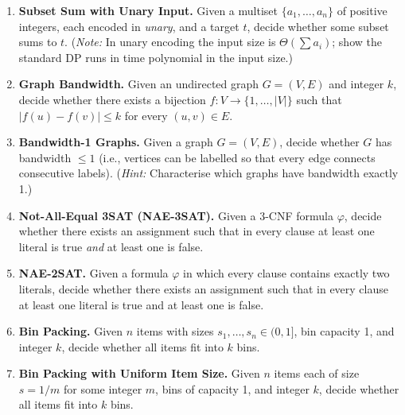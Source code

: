 \documentclass[9pt]{book}
\begin{document}
\begin{enumerate}[label=\arabic*.]
\bigskip

\item \textbf{Subset Sum with Unary Input.}
Given a multiset $\{a_1,\ldots,a_n\}$ of positive integers, each encoded in \emph{unary}, and a target $t$, decide whether some subset sums to $t$.
(\textit{Note:} In unary encoding the input size is $\Theta(\sum a_i)$; show the standard DP runs in time polynomial in the input size.)

\bigskip

\item \textbf{Graph Bandwidth.}
Given an undirected graph $G=(V,E)$ and integer $k$, 
decide whether there exists a bijection $f:V\to\{1,\ldots,|V|\}$ 
such that $|f(u)-f(v)|\leq k$ for every $(u,v)\in E$.

\bigskip

\item \textbf{Bandwidth-1 Graphs.}
Given a graph $G=(V,E)$, decide whether $G$ has bandwidth $\leq 1$ 
(i.e., vertices can be labelled so that every edge connects consecutive labels).
(\textit{Hint:} Characterise which graphs have bandwidth exactly 1.)

\bigskip

\item \textbf{Not-All-Equal 3SAT (NAE-3SAT).}
Given a 3-CNF formula $\varphi$, decide whether there exists an 
assignment such that in every clause at least one literal is 
true \emph{and} at least one is false.

\bigskip

\item \textbf{NAE-2SAT.}
Given a formula $\varphi$ in which every clause contains exactly 
two literals, decide whether there exists an assignment such that 
in every clause at least one literal is true and at least one is false.

\bigskip

\item \textbf{Bin Packing.}
Given $n$ items with sizes $s_1,\ldots,s_n\in(0,1]$, bin capacity 1, 
and integer $k$, decide whether all items fit into $k$ bins.

\bigskip

\item \textbf{Bin Packing with Uniform Item Size.}
Given $n$ items each of size $s = 1/m$ for some integer $m$, 
bins of capacity 1, and integer $k$, decide whether all items fit into $k$ bins.

\bigskip


\end{enumerate}
\end{document}
